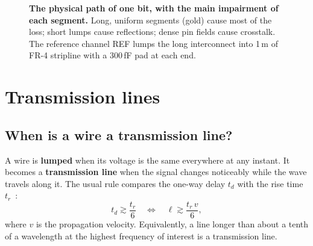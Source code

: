 \begin{figure}[tbp]
\caption{\textbf{The physical path of one bit, with the main impairment of each segment.} Long, uniform segments (gold) cause most of the loss; short lumps cause reflections; dense pin fields cause crosstalk. The \OS{} reference channel REF lumps the long interconnect into 1\,m of FR-4 stripline with a 300\,fF pad at each end.}
\label{fig:ch3-path}
\end{figure}

\section{Transmission lines}\label{sec:tline}

\subsection{When is a wire a transmission line?}
A wire is \textbf{lumped} when its voltage is the same everywhere at any instant. It becomes a \textbf{transmission line} when the signal changes noticeably while the wave travels along it. The usual rule compares the one-way delay $t_d$ with the rise time $t_r$~\citep{p2:johnson1993,hall2009}:
\begin{equation}
  t_d \gtrsim \frac{t_r}{6}
  \quad\Longleftrightarrow\quad
  \ell \gtrsim \frac{t_r\, v}{6},
  \label{eq:ch3-tline-rule}
\end{equation}
where $v$ is the propagation velocity. Equivalently, a line longer than about a tenth of a wavelength at the highest frequency of interest is a transmission line.

